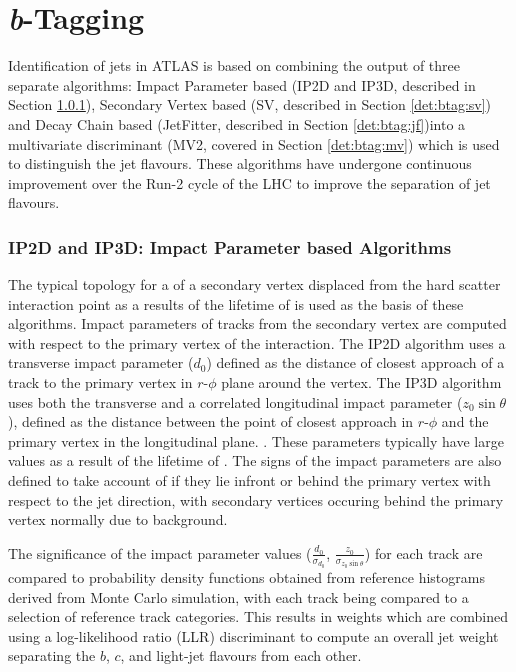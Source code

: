 \section{\textit{b}-Tagging}
\label{det:btagging}

	Identification of \bquark jets in ATLAS is based on combining the output of three separate \btag algorithms: Impact Parameter based (IP2D and IP3D, described in Section \ref{det:btag:ip}), Secondary Vertex based (SV, described in Section \ref{det:btag:sv}) and Decay Chain based (JetFitter, described in Section \ref{det:btag:jf})into a multivariate discriminant (MV2, covered in Section \ref{det:btag:mv}) which is used to distinguish the jet flavours. These algorithms have undergone continuous improvement over the Run-2 cycle of the LHC to improve the separation of jet flavours.

	\subsubsection{IP2D and IP3D: Impact Parameter based Algorithms}
		\label{det:btag:ip}

		The typical topology for a \bhadron of a secondary vertex displaced from the hard scatter interaction point as a results of the lifetime of \bquark is used as the basis of these algorithms. Impact parameters of tracks from the secondary vertex are computed with respect to the primary vertex of the interaction. The IP2D algorithm uses a transverse impact parameter ($d_0$) defined as the distance of closest approach of a track to the  primary vertex in $r$-$\phi$ plane around the vertex. The IP3D algorithm uses both the transverse and a correlated longitudinal impact parameter ($z_0\sin\theta$), defined as the distance between the point of closest approach in $r$-$\phi$ and the primary vertex in the longitudinal plane. . These parameters typically have large values as a result of the lifetime of \bquark. The signs of the impact parameters are also defined to take account of if they lie infront or behind the primary vertex with respect to the jet direction, with secondary vertices occuring behind the primary vertex normally due to background.

		The significance of the impact parameter values ($\frac{d_0}{\sigma_{d_0}}$, $\frac{z_0}{\sigma_{z_0\sin\theta}}$) for each track are compared to probability density functions obtained from reference histograms derived from Monte Carlo simulation, with each track being compared to a selection of reference track categories. This results in weights which are combined using a log-likelihood ratio (LLR) discriminant to compute an overall jet weight separating the $b$, $c$, and light-jet flavours from each other. \cite{btagOptimisation, bTagPerformance}

